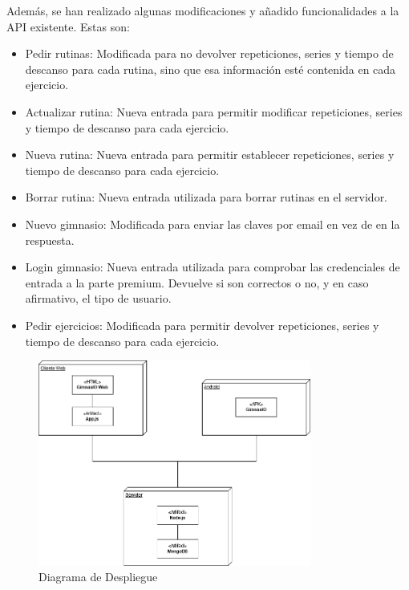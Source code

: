 \documentclass[11pt,a4paper]{report}
\begin{document}
Además, se han realizado algunas modificaciones y añadido funcionalidades a la API existente. Estas son:
\begin{itemize}
	\item Pedir rutinas: Modificada para no devolver repeticiones, series y tiempo de descanso para cada rutina, sino que esa información esté contenida en cada ejercicio.

	\item Actualizar rutina: Nueva entrada para permitir modificar repeticiones, series y tiempo de descanso para cada ejercicio.

	\item Nueva rutina: Nueva entrada para permitir establecer repeticiones, series y tiempo de descanso para cada ejercicio.

	\item Borrar rutina: Nueva entrada utilizada para borrar rutinas en el servidor.

	\item Nuevo gimnasio: Modificada para enviar las claves por email en vez de en la respuesta.

	\item Login gimnasio: Nueva entrada utilizada para comprobar las credenciales de entrada a la parte premium. Devuelve si son correctos o no, y en caso afirmativo, el tipo de usuario.

	\item Pedir ejercicios: Modificada para permitir devolver repeticiones, series y tiempo de descanso para cada ejercicio.

\end{itemize}
\begin{figure}[H]
	\centering
	\includegraphics[width=0.8\textwidth]{graficos/despliegue.png}
	\caption{Diagrama de Despliegue }
	\label{fig: deploy2}
\end{figure}
\end{document}

